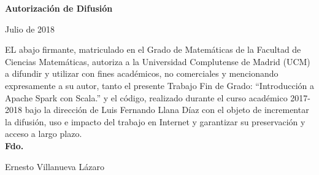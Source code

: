 \thispagestyle{empty}

\begin{titlepage}

\null
\vfill


\begin{center}
\textbf{Autorización de Difusión}\\
\end{center}


\begin{center}
Julio de 2018
\end{center}
EL abajo firmante, matriculado en el Grado de Matemáticas de la Facultad de
Ciencias Matemáticas, autoriza a la Universidad Complutense de Madrid (UCM) a difundir y
utilizar con fines académicos, no comerciales y mencionando expresamente a su autor, tanto  el presente Trabajo Fin de Grado: “Introducción a Apache Spark con Scala.” y el código, realizado durante el curso académico 2017-2018 bajo la dirección de Luis Fernando Llana Díaz con el objeto de incrementar la difusión, uso e impacto del trabajo en Internet y garantizar su preservación y acceso a largo plazo.\\


\textbf{Fdo.}

\begin{center}
Ernesto Villanueva Lázaro

\end{center}

\vfill\null

\end{titlepage}

\thispagestyle{empty}